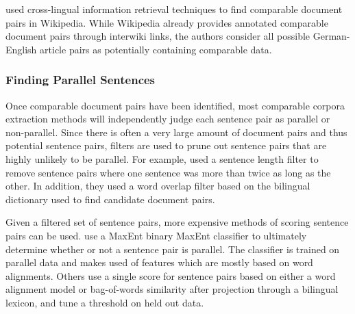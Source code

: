 \citet{Ture12} used cross-lingual information retrieval techniques to find
comparable document pairs in Wikipedia. While Wikipedia already provides
annotated comparable document pairs through interwiki links, the authors
consider all possible German-English article pairs as potentially containing
comparable data.

\subsubsection{Finding Parallel Sentences}
Once comparable document pairs have been identified, most comparable corpora
extraction methods will independently judge each sentence pair as parallel or
non-parallel. Since there is often a very large amount of document pairs and
thus potential sentence pairs, filters are used to prune out sentence pairs that
are highly unlikely to be parallel. For example, \citet{Munteanu05} used a
sentence length filter to remove sentence pairs where one sentence was more than
twice as long as the other. In addition, they used a word overlap filter based
on the bilingual dictionary used to find candidate document pairs.

Given a filtered set of sentence pairs, more expensive methods of scoring
sentence pairs can be used. \citet{Munteanu05} use a MaxEnt binary MaxEnt
classifier to ultimately determine whether or not a sentence pair is parallel.
The classifier is trained on parallel data and makes used of features which are
mostly based on word alignments. Others
\cite{Fung04a,Fung04b,Tillmann09a,Tillmann09b} use a single score for sentence
pairs based on either a word alignment model or bag-of-words similarity after
projection through a bilingual lexicon, and tune a threshold on held out data.

